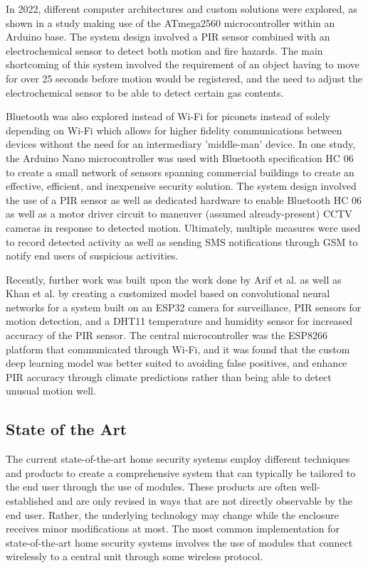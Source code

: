 In 2022, different computer architectures and custom solutions were explored,
as shown in a study making use of the ATmega2560 microcontroller within an Arduino base. The
system design involved a PIR sensor combined with an electrochemical sensor to detect both
motion and fire hazards. The main shortcoming of this system involved the requirement of an
object having to move for over 25 seconds before motion would be registered, and the need to
adjust the electrochemical sensor to be able to detect certain gas contents.
\cite{rhizmaSuhendar2022}

Bluetooth was also explored instead of Wi-Fi for piconets instead of solely depending on
Wi-Fi which allows for higher fidelity communications between devices without the need for an
intermediary 'middle-man' device. In one study, the Arduino Nano microcontroller was used
with Bluetooth specification HC 06 to create a small network of sensors spanning commercial
buildings to create an effective, efficient, and inexpensive security solution. The system
design involved the use of a PIR sensor as well as dedicated hardware to enable Bluetooth HC
06 as well as a motor driver circuit to maneuver (assumed already-present) CCTV cameras in
response to detected motion. Ultimately, multiple measures were used to record detected
activity as well as sending SMS notifications through GSM to notify end users of suspicious
activities. \cite{HameedEtAl2022}

Recently, further work was built upon the work done by Arif et al. as well as Khan et al. by
creating a customized model based on convolutional neural networks for a system built on an
ESP32 camera for surveillance, PIR sensors for motion detection, and a DHT11 temperature and
humidity sensor for increased accuracy of the PIR sensor. The central microcontroller was the
ESP8266 platform that communicated through Wi-Fi, and it was found that the custom deep
learning model was better suited to avoiding false positives, and enhance PIR accuracy
through climate predictions rather than being able to detect unusual motion well.
\cite{TaiwoEtAl2022}

\subsection{State of the Art}\label{subsec:state-of-the-art}

The current state-of-the-art home security systems employ different techniques and products
to create a comprehensive system that can typically be tailored to the end user through the
use of modules. These products are often well-established and are only revised in ways that
are not directly observable by the end user. Rather, the underlying technology may change
while the enclosure receives minor modifications at most. \cite{sarhan2020} The most common
implementation for state-of-the-art home security systems involves the use of modules that
connect wirelessly to a central unit through some wireless protocol. \cite{joseMalekian2017} \cite{chowdhuryAhmed2021} \cite{WahyuniEtAl2021} \cite{rhizmaSuhendar2022} \cite{HameedEtAl2022}

